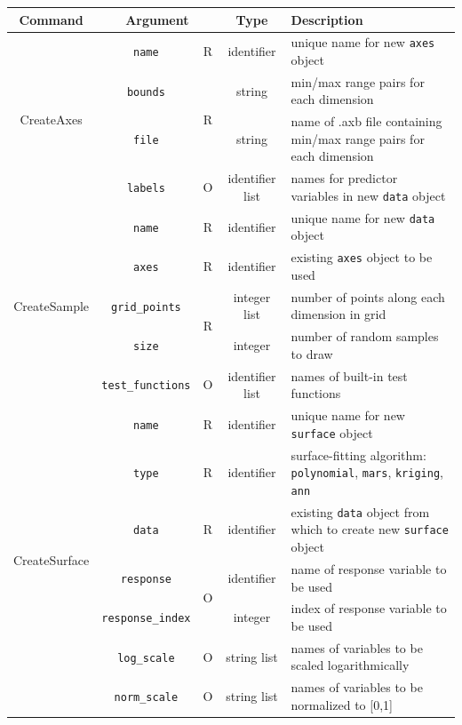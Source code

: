 \documentclass{article}
\begin{document}
\begin{table}[h]
  \newcommand\T{\rule{0pt}{2.6ex}}
  \newcommand\B{\rule[-1.2ex]{0pt}{0pt}}
  \centering
  \begin{tabular}{|c|c|c|c|p{8cm}|}
    \hline
    {\bf Command} & \multicolumn{2}{|c|}{\bf Argument}  & {\bf Type} & {\bf Description}  \\ 
    \hline
    \multirow{4}{*}{CreateAxes} & \texttt{name} & R & identifier & unique name for new \texttt{axes} object \\
    \cline{2-5}
    & \texttt{bounds} & \multirow{2}{*}{R} & string & min/max range pairs for each dimension \\
    \cline{2-2} \cline{4-5}
    & \texttt{file} & & string & name of .axb file containing min/max range pairs for each dimension \\
    \cline{2-5}
    & \texttt{labels} & O & identifier list & names for predictor variables in new \texttt{data} object \\
    \hline
   
    \multirow{5}{*}{CreateSample} & \texttt{name} & R & identifier & unique name for new \texttt{data} object\\
    \cline{2-5}
    & \texttt{axes} & R & identifier & existing \texttt{axes} object to be used \\
    \cline{2-5}
    & \texttt{grid\_points} & \multirow{2}{*}{R} & integer list & number of points along each dimension in grid \\
    \cline{2-2} \cline{4-5}
    & \texttt{size} & & integer & number of random samples to draw \\
    \cline{2-5}
    & \texttt{test\_functions} & O & identifier list & names of built-in test functions\\
    \hline

    \multirow{7}{*}{CreateSurface} & \texttt{name} & R & identifier & unique name for new \texttt{surface} object \\
    \cline{2-5}
    & \texttt{type} & R & identifier & surface-fitting algorithm: \texttt{polynomial}, \texttt{mars}, \texttt{kriging}, \texttt{ann} \\
    \cline{2-5}
    & \texttt{data} & R & identifier & existing \texttt{data} object from which to create new \texttt{surface} object \\
    \cline{2-5}
    & \texttt{response} & \multirow{2}{*}{O} & identifier & name of response variable to be used \\
    \cline{2-2} \cline{4-5}
    & \texttt{response\_index} &  & integer & index of response variable to be used \\
    \cline{2-5}
    & \texttt{log\_scale} & O & string list & names of variables to be scaled logarithmically \\
    \cline{2-5}
    & \texttt{norm\_scale} & O & string list & names of variables to be normalized to [0,1] \\
    \hline


\end{tabular}
\end{table}
\end{document}
